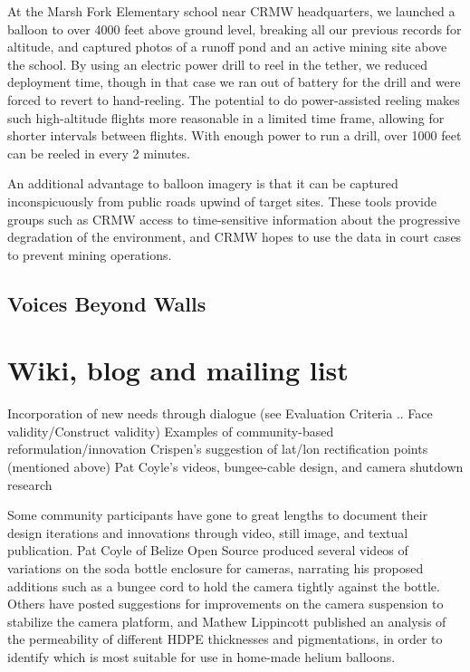 \documentclass[11pt]{report}
\begin{document}
At the Marsh Fork Elementary school near CRMW headquarters, we launched a balloon to over 4000 feet above ground level, breaking all our previous records for altitude, and captured photos of a runoff pond and an active mining site above the school. By using an electric power drill to reel in the tether, we reduced deployment time, though in that case we ran out of battery for the drill and were forced to revert to hand-reeling. The potential to do power-assisted reeling makes such high-altitude flights more reasonable in a limited time frame, allowing for shorter intervals between flights. With enough power to run a drill, over 1000 feet can be reeled in every 2 minutes. 

An additional advantage to balloon imagery is that it can be captured inconspicuously from public roads upwind of target sites. These tools provide groups such as CRMW access to time-sensitive information about the progressive degradation of the environment, and CRMW hopes to use the data in court cases to prevent mining operations.

\subsection{Voices Beyond Walls}

\section{Wiki, blog and mailing list}
        Incorporation of new needs through dialogue (see Evaluation Criteria .. Face validity/Construct validity)
        Examples of community-based reformulation/innovation
            Crispen's suggestion of lat/lon rectification points (mentioned above)
            Pat Coyle's videos, bungee-cable design, and camera shutdown research

Some community participants have gone to great lengths to document their design iterations and innovations through video, still image, and textual publication. Pat Coyle of Belize Open Source produced several videos of variations on the soda bottle enclosure for cameras, narrating his proposed additions such as a bungee cord to hold the camera tightly against the bottle. Others have posted suggestions for improvements on the camera suspension to stabilize the camera platform, and Mathew Lippincott published an analysis of the permeability of different HDPE thicknesses and pigmentations, in order to identify which is most suitable for use in home-made helium balloons.
\end{document}
